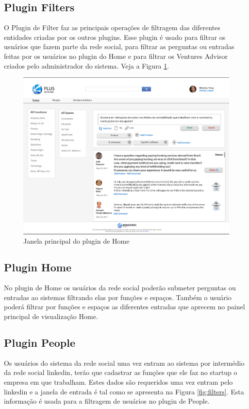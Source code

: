 \documentclass[12pt, letterpaper, onecolumn]{article}
\begin{document}
\subsection{Plugin Filters}
O Plugin de Filter faz as principais operações de filtragem das diferentes entidades criadas por os outros plugins. Esse plugin é usado para filtrar os usuários que fazem parte da rede social, para filtrar as perguntas ou entradas feitas por os usuários no plugin do Home e para filtrar os Ventures Advisor criados pelo administrador do sistema. Veja a Figura \ref{fig:Home}.

\begin{figure}[htpb]
\centering
\includegraphics[scale=.35]{images/home.png}
\caption{Janela principal do plugin de Home}
\label{fig:Home}
\end{figure}

\subsection{Plugin Home}
No plugin de Home os usuários da rede social poderão submeter perguntas ou entradas ao sistemas filtrando elas por funções e espaços. Também o usuário poderá filtrar por funções e espaços as diferentes entradas que aprecem no painel principal de visualização Home.

\subsection{Plugin People}
Os usuários do sistema da rede social uma vez entram ao sistema por intermédio da rede social linkedin, terão que cadastrar as funções que ele faz no startup o empresa em que trabalham. Estes dados são requeridos uma vez entram pelo linkedin e a janela de entrada é tal como se apresenta na Figura  \ref{fig:filters}. Esta informação é usada para a filtragem de usuários no plugin de People. 
\end{document}

